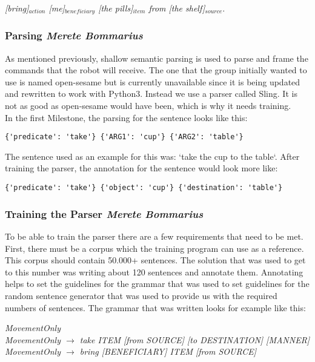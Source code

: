 \documentclass[main.tex]{subfiles}
\begin{document}
            \textit{ [bring]$_{action}$  [me]$_{beneficiary}$ [the pills]$_{item}$ from [the shelf]$_{source}.$}
        \subsubsection{Parsing \small{\textit{Merete Bommarius}}}     
            As mentioned previously, shallow semantic parsing is used to parse and frame the commands that the robot will receive. The one that the group initially wanted to use is named open-sesame but is currently unavailable since it is being updated and rewritten to work with Python3. Instead we use a parser called Sling. It is not as good as open-sesame would have been, which is why it needs training.\\ 
            In the first Milestone, the parsing for the sentence looks like this:
    
\begin{lstlisting}
{'predicate': 'take'} {'ARG1': 'cup'} {'ARG2': 'table'}
\end{lstlisting}
            
            The sentence used as an example for this was: ‘take the cup to the table‘. After training the parser, the annotation for the sentence would look more like:
            
\begin{lstlisting}
{'predicate': 'take'} {'object': 'cup'} {'destination': 'table'}
\end{lstlisting}
            
        \subsubsection{Training the Parser \small{\textit{Merete Bommarius}}}
            To be able to train the parser there are a few requirements that need to be met. First, there must be a corpus which the training program can use as a reference. This corpus should contain 50.000+ sentences. The solution that was used to get to this number was writing about 120 sentences and annotate them. Annotating helps to set the guidelines for the grammar that was used to set guidelines for the random sentence generator that was used to provide us with the required numbers of sentences.
            The grammar that was written looks for example like this:
            
            
\textit{MovementOnly\\
                MovementOnly $\rightarrow$ take ITEM [from SOURCE] [to DESTINATION] [MANNER]\\
                MovementOnly $\rightarrow$ bring [BENEFICIARY] ITEM [from SOURCE]}
                
\end{document}
